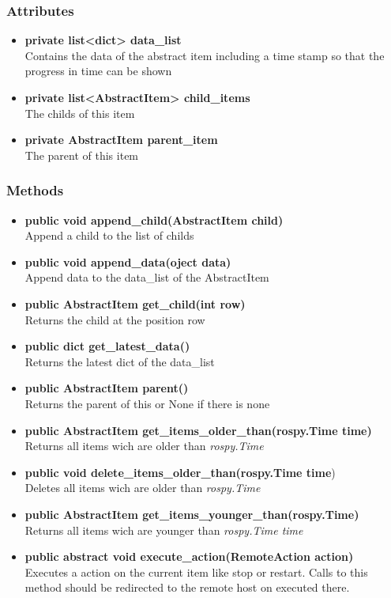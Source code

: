 \subsubsection{Attributes}
\begin{itemize}
  \item \textbf{private list<dict> data\_list}\\ 
  Contains the data of the abstract item including a time stamp so that
  the progress in time can be shown
  \item \textbf{private list<AbstractItem> child\_items}\\ 
  The childs of this item
  \item \textbf{private AbstractItem parent\_item}\\ 
  The parent of this item
\end{itemize}
\subsubsection{Methods}
\begin{itemize}
   \item \textbf{public void append\_child(AbstractItem child)}\\ 
   Append a child to the list of childs
  \item \textbf{public void append\_data(oject data)}\\ 
  Append data to the data\_list of the AbstractItem
  \item \textbf{public AbstractItem get\_child(int row)}\\ 
  Returns the child at the position row
  \item \textbf{public dict get\_latest\_data()}\\ 
  Returns the latest dict of the data\_list 
  \item \textbf{public AbstractItem parent()}\\ 
  Returns the parent of this or None if there is none
  \item \textbf{public AbstractItem get\_items\_older\_than(rospy.Time time)}\\
  Returns all items wich are older than \textit{rospy.Time}
  \item \textbf{public void delete\_items\_older\_than(rospy.Time time})\\
  Deletes all items wich are older than \textit{rospy.Time}
  \item \textbf{public AbstractItem get\_items\_younger\_than(rospy.Time)}\\
  Returns all items wich are younger than \textit{rospy.Time time}
  \item \textbf{public abstract void execute\_action(RemoteAction action)}\\ 
  Executes a action on the current item like stop or restart. Calls to this
  method should be redirected to the remote host on executed there.
\end{itemize}

